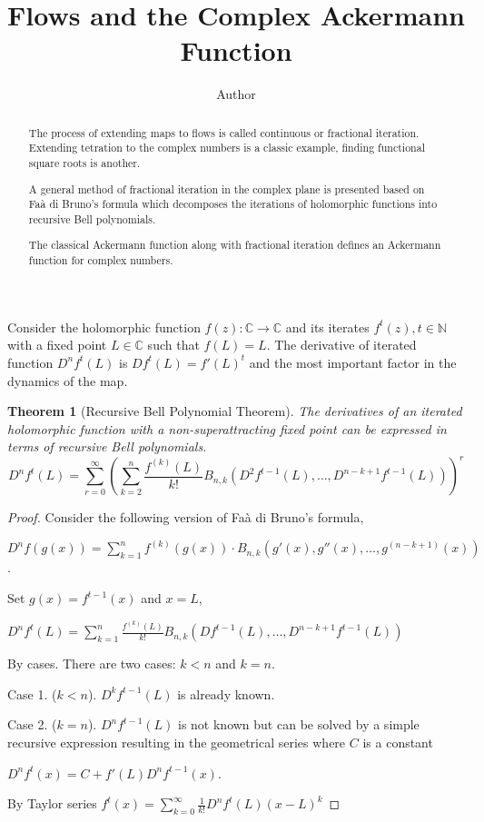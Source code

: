 \documentclass{article}
\newtheorem{theorem}{Theorem}
\theoremstyle{definition}
\begin{document}
\title{Flows and the Complex Ackermann Function}
\author{Author}

\maketitle

\begin{abstract}
The process of extending maps to flows is called continuous or fractional iteration. Extending tetration to the complex numbers is a classic example, finding functional square roots is another.

A general method of fractional iteration in the complex plane is presented based on Faà di Bruno's formula which decomposes the iterations of holomorphic functions into recursive Bell polynomials.

The classical Ackermann function along with fractional iteration defines an Ackermann function for complex numbers. 
\end{abstract}

\noindent

Consider the holomorphic function $f(z): \mathbb{C} \rightarrow \mathbb{C}$ and its iterates $f^t(z), t \in \mathbb{N}$ with a fixed point $L\in\mathbb{C}$ such that $f(L)=L$. The derivative of iterated function $D^nf^t(L)$ is $Df^t(L)=f'(L)^t$ and the most important factor in the dynamics of the map.

\begin{theorem}[Recursive Bell Polynomial Theorem]
The derivatives of an iterated holomorphic function with a non-superattracting fixed point can be expressed in terms of recursive Bell polynomials.
$$D^nf^t(L)=\sum_{r=0}^\infty(\sum_{k=2}^n \frac{f^{(k)}(L)}{k!} B_{n,k}(D^2f^{t-1}(L),\ldots, D^{n-k+1}f^{t-1}(L)))^r$$
\end{theorem}

\begin{proof}
Consider the following version of Faà di Bruno's formula, \cite{weisstein}

${D^n} f(g(x)) = \sum_{k=1}^n f^{(k)}(g(x))\cdot B_{n,k}\left(g'(x),g''(x),\dots,g^{(n-k+1)}(x)\right)$.

Set $g(x)=f^{t-1}(x)$ and $x=L$,

$D^nf^t(L)=\sum_{k=1}^n \frac{f^{(k)}(L)}{k!} B_{n,k}(Df^{t-1}(L),\ldots, D^{n-k+1}f^{t-1}(L))$

By cases. There are two cases: $k<n$ and $k=n$.

Case 1. ($k<n$). $D^kf^{t-1}(L)$ is already known.

Case 2. ($k=n$). $D^nf^{t-1}(L)$ is not known but can be solved by a simple recursive expression resulting in the geometrical series where $C$ is a constant

$D^nf^t(x)=C+f'(L)D^nf^{t-1}(x)$.

By Taylor series $f^t(x)=\sum_{k=0}^\infty\frac{1}{k!} D^nf^t(L) (x - L)^k$
\end{proof}
\end{document}
